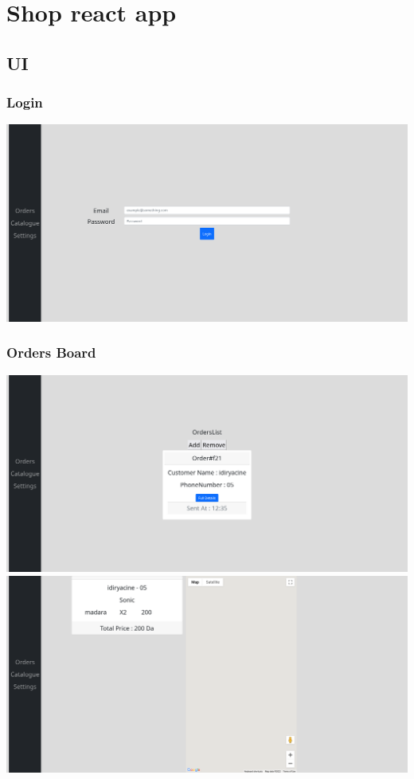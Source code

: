 \documentclass{article}
\begin{document}
\section{Shop react app}

\subsection{UI}

\subsubsection{Login}
\includegraphics[scale=0.25]{./out/ReactApp/Ui/Login/Login.png}

\subsubsection{Orders Board}
\includegraphics[scale=0.25]{./out/ReactApp/Ui/Orders/Orders.png}
\includegraphics[scale=0.25]{./out/ReactApp/Ui/Orders/OrderDetails.png}
\end{document}

